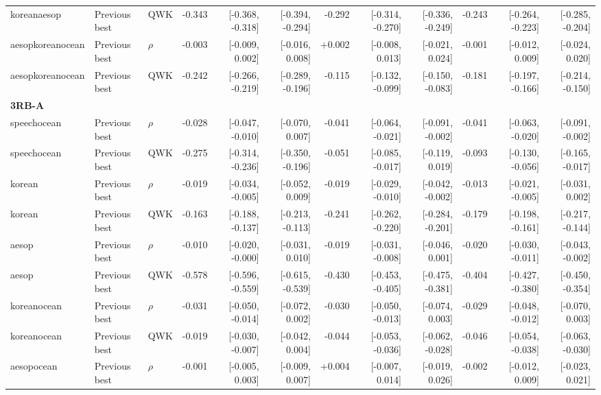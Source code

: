 \documentclass[10pt]{article}
\begin{document}
\begin{landscape}
\begin{longtable}{@{}lllrrrrrrrrr@{}}
koreanaesop & Previous best & QWK & -0.343 & [-0.368, -0.318] & [-0.394, -0.294] & -0.292 & [-0.314, -0.270] & [-0.336, -0.249] & -0.243 & [-0.264, -0.223] & [-0.285, -0.204]\\
aesopkoreanocean & Previous best & $\rho$ & -0.003 & [-0.009, 0.002] & [-0.016, 0.008] & +0.002 & [-0.008, 0.013] & [-0.021, 0.024] & -0.001 & [-0.012, 0.009] & [-0.024, 0.020]\\
aesopkoreanocean & Previous best & QWK & -0.242 & [-0.266, -0.219] & [-0.289, -0.196] & -0.115 & [-0.132, -0.099] & [-0.150, -0.083] & -0.181 & [-0.197, -0.166] & [-0.214, -0.150]\\
\multicolumn{12}{l}{\textbf{3RB-A}}\\*
speechocean & Previous best & $\rho$ & -0.028 & [-0.047, -0.010] & [-0.070, 0.007] & -0.041 & [-0.064, -0.021] & [-0.091, -0.002] & -0.041 & [-0.063, -0.020] & [-0.091, -0.002]\\
speechocean & Previous best & QWK & -0.275 & [-0.314, -0.236] & [-0.350, -0.196] & -0.051 & [-0.085, -0.017] & [-0.119, 0.019] & -0.093 & [-0.130, -0.056] & [-0.165, -0.017]\\
korean & Previous best & $\rho$ & -0.019 & [-0.034, -0.005] & [-0.052, 0.009] & -0.019 & [-0.029, -0.010] & [-0.042, -0.002] & -0.013 & [-0.021, -0.005] & [-0.031, 0.002]\\
korean & Previous best & QWK & -0.163 & [-0.188, -0.137] & [-0.213, -0.113] & -0.241 & [-0.262, -0.220] & [-0.284, -0.201] & -0.179 & [-0.198, -0.161] & [-0.217, -0.144]\\
aesop & Previous best & $\rho$ & -0.010 & [-0.020, -0.000] & [-0.031, 0.010] & -0.019 & [-0.031, -0.008] & [-0.046, 0.001] & -0.020 & [-0.030, -0.011] & [-0.043, -0.002]\\
aesop & Previous best & QWK & -0.578 & [-0.596, -0.559] & [-0.615, -0.539] & -0.430 & [-0.453, -0.405] & [-0.475, -0.381] & -0.404 & [-0.427, -0.380] & [-0.450, -0.354]\\
koreanocean & Previous best & $\rho$ & -0.031 & [-0.050, -0.014] & [-0.072, 0.002] & -0.030 & [-0.050, -0.013] & [-0.074, 0.003] & -0.029 & [-0.048, -0.012] & [-0.070, 0.003]\\
koreanocean & Previous best & QWK & -0.019 & [-0.030, -0.007] & [-0.042, 0.004] & -0.044 & [-0.053, -0.036] & [-0.062, -0.028] & -0.046 & [-0.054, -0.038] & [-0.063, -0.030]\\
aesopocean & Previous best & $\rho$ & -0.001 & [-0.005, 0.003] & [-0.009, 0.007] & +0.004 & [-0.007, 0.014] & [-0.019, 0.026] & -0.002 & [-0.012, 0.009] & [-0.023, 0.021]\\

\end{longtable}
\end{landscape}
\end{document}
